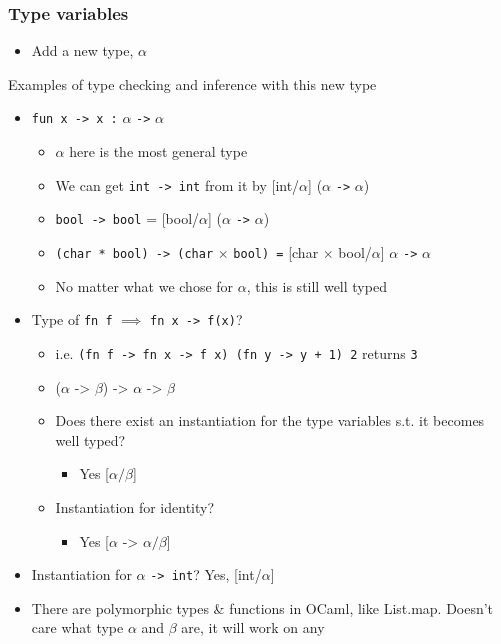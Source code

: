 \documentclass[11pt]{article}
\begin{document}
\subsubsection{Type variables}
\label{sec:orga1c73cd}
\begin{itemize}
\item Add a new type, \(\alpha\)
\end{itemize}
Examples of type checking and inference with this new type
\begin{itemize}
\item \texttt{fun x -> x :} \(\alpha\) \texttt{->} \(\alpha\)
\begin{itemize}
\item \(\alpha\) here is the most general type
\item We can get \texttt{int -> int} from it by [int/\(\alpha\)] (\(\alpha\) \texttt{->} \(\alpha\))
\item \texttt{bool -> bool} = [bool/\(\alpha\)] (\(\alpha\) \texttt{->} \(\alpha\))
\item \texttt{(char * bool) -> (char} \(\times\) \texttt{bool) =} [char \(\times\) bool/\(\alpha\)] \(\alpha\) \texttt{->} \(\alpha\)
\item No matter what we chose for \(\alpha\), this is still well typed
\end{itemize}
\item Type of \texttt{fn f} \(\implies\) \texttt{fn x -> f(x)}?
\begin{itemize}
\item i.e. \texttt{(fn f -> fn x -> f x) (fn y -> y + 1) 2} returns \texttt{3}
\item (\(\alpha\) -> \(\beta\)) -> \(\alpha\) -> \(\beta\)
\item Does there exist an instantiation for the type variables s.t. it becomes well typed?
\begin{itemize}
\item Yes [\(\alpha/\beta\)]
\end{itemize}
\item Instantiation for identity?
\begin{itemize}
\item Yes [\(\alpha\) -> \(\alpha/\beta\)]
\end{itemize}
\end{itemize}
\item Instantiation for \(\alpha\) \texttt{-> int}? Yes, [int/\(\alpha\)]
\item There are polymorphic types \& functions in OCaml, like List.map. Doesn't care what type \(\alpha\) and \(\beta\) are, it will work on any
\end{itemize}
\end{document}
